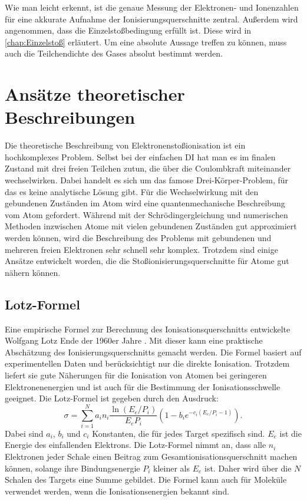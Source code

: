 Wie man leicht erkennt, ist die genaue Messung der Elektronen- und Ionenzahlen für eine akkurate Aufnahme der Ionisierungsquerschnitte zentral. Außerdem wird angenommen, dass die Einzelstoßbedingung erfüllt ist. Diese wird in \ref{chap:Einzelstoß} erläutert. Um eine absolute Aussage treffen zu können, muss auch die Teilchendichte des Gases absolut bestimmt werden.


\section{Ansätze theoretischer Beschreibungen}
Die theoretische Beschreibung von Elektronenstoßionisation ist ein hochkomplexes Problem. Selbst bei der einfachen DI hat man es im finalen Zustand mit drei freien Teilchen zutun, die über die Coulombkraft miteinander wechselwirken. Dabei handelt es sich um das famose Drei-Körper-Problem, für das es keine analytische Lösung gibt. Für die Wechselwirkung mit den gebundenen Zuständen im Atom wird eine quantenmechanische Beschreibung vom Atom gefordert. Während mit der Schrödingergleichung und numerischen Methoden inzwischen Atome mit vielen gebundenen Zuständen gut approximiert werden können, wird die Beschreibung des Problems mit gebundenen und mehreren freien Elektronen sehr schnell sehr komplex. Trotzdem sind einige Ansätze entwickelt worden, die die Stoßionisierungsquerschnitte für Atome gut nähern können.

\subsection{Lotz-Formel}
Eine empirische Formel zur Berechnung des Ionisationsquerschnitts entwickelte Wolfgang Lotz Ende der 1960er Jahre \cite{Lotz}. Mit dieser kann eine praktische Abschätzung des Ionisierungsquerschnitts gemacht werden. Die Formel basiert auf experimentellen Daten und berücksichtigt nur die direkte Ionisation. Trotzdem liefert sie gute Näherungen für die Ionisation von Atomen bei geringeren Elektronenenergien und ist auch für die Bestimmung der Ionisationsschwelle geeignet. Die Lotz-Formel ist gegeben durch den Ausdruck:
\begin{equation}
    \sigma = \sum_{i=1}^{N} a_i n_i \frac{ \ln (E_e / P_i) }{E_e P_i} \left( 1 - b_i e ^{-c_i (E_e / P_i-1)}\right).
\end{equation}
Dabei sind $a_i$, $b_i$ und $c_i$ Konstanten, die für jedes Target spezifisch sind. $E_e$ ist die Energie des einfallenden Elektrons. Die Lotz-Formel nimmt an, dass alle $n_i$ Elektronen jeder Schale einen Beitrag zum Gesamtionisationsquerschnitt machen können, solange ihre Bindungsenergie $P_i$ kleiner als $E_e$ ist. Daher wird über die $N$ Schalen des Targets eine Summe gebildet. Die Formel kann auch für Moleküle verwendet werden, wenn die Ionisationsenergien bekannt sind.

